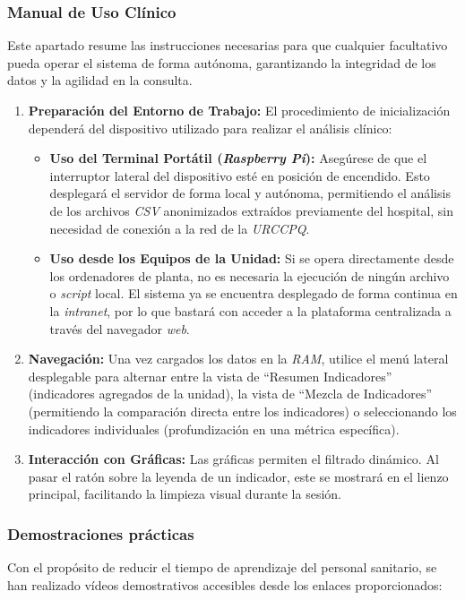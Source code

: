 \subsubsection{Manual de Uso Clínico}
Este apartado resume las instrucciones necesarias para que cualquier facultativo pueda operar el sistema de forma autónoma, garantizando la integridad de los datos y la agilidad en la consulta.

\begin{enumerate}
    \item \textbf{Preparación del Entorno de Trabajo:} El procedimiento de inicialización dependerá del dispositivo utilizado para realizar el análisis clínico:
\begin{itemize}
    \item \textbf{Uso del Terminal Portátil (\textit{Raspberry Pi}):} Asegúrese de que el interruptor lateral del dispositivo esté en posición de encendido. Esto desplegará el servidor de forma local y autónoma, permitiendo el análisis de los archivos \textit{CSV} anonimizados extraídos previamente del hospital, sin necesidad de conexión a la red de la \textit{URCCPQ}.
    \item \textbf{Uso desde los Equipos de la Unidad:} Si se opera directamente desde los ordenadores de planta, no es necesaria la ejecución de ningún archivo o \textit{script} local. El sistema ya se encuentra desplegado de forma continua en la \textit{intranet}, por lo que bastará con acceder a la plataforma centralizada a través del navegador \textit{web}.
\end{itemize}
    \item \textbf{Navegación:} Una vez cargados los datos en la \textit{RAM}, utilice el menú lateral desplegable para alternar entre la vista de ``Resumen Indicadores'' (indicadores agregados de la unidad), la vista de ``Mezcla de Indicadores'' (permitiendo la comparación directa entre los indicadores) o seleccionando los indicadores individuales (profundización en una métrica específica).
    \item \textbf{Interacción con Gráficas:} Las gráficas permiten el filtrado dinámico. Al pasar el ratón sobre la leyenda de un indicador, este se mostrará en el lienzo principal, facilitando la limpieza visual durante la sesión.
\end{enumerate}

\subsubsection{Demostraciones prácticas}
Con el propósito de reducir el tiempo de aprendizaje del personal sanitario, se han realizado vídeos demostrativos accesibles desde los enlaces proporcionados:

